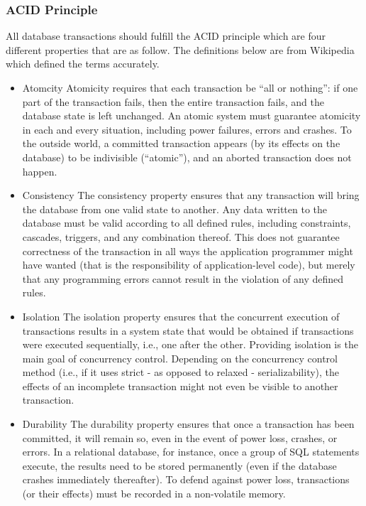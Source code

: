 \documentclass[a4paper]{article}
\begin{document}
\subsubsection{ACID Principle}
All database transactions should fulfill the ACID principle which are four different properties that are as follow. The definitions below are from Wikipedia which defined the terms accurately.
\begin{itemize}
\item Atomcity Atomicity requires that each transaction be “all or nothing”: if one part of the transaction fails, then the entire transaction fails, and the database state is left unchanged. An atomic system must guarantee atomicity in each and every situation, including power failures, errors and crashes. To the outside world, a committed transaction appears (by its effects on the database) to be indivisible (“atomic”), and an aborted transaction does not happen.
\item Consistency The consistency property ensures that any transaction will bring the database from one valid state to another. Any data written to the database must be valid according to all defined rules, including constraints, cascades, triggers, and any combination thereof. This does not guarantee correctness of the transaction in all ways the application programmer might have wanted (that is the responsibility of application-level code), but merely that any programming errors cannot result in the violation of any defined rules.
\item Isolation The isolation property ensures that the concurrent execution of transactions results in a system state that would be obtained if transactions were executed sequentially, i.e., one after the other. Providing isolation is the main goal of concurrency control. Depending on the concurrency control method (i.e., if it uses strict - as opposed to relaxed - serializability), the effects of an incomplete transaction might not even be visible to another transaction.
\item Durability The durability property ensures that once a transaction has been committed, it will remain so, even in the event of power loss, crashes, or errors. In a relational database, for instance, once a group of SQL statements execute, the results need to be stored permanently (even if the database crashes immediately thereafter). To defend against power loss, transactions (or their effects) must be recorded in a non-volatile memory.
\end{itemize}
\end{document}
